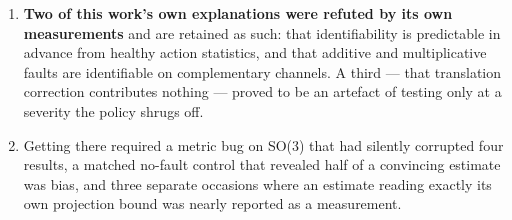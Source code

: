 \documentclass[11pt,a4paper]{article}
\begin{document}
\begin{enumerate}[leftmargin=1.6em,itemsep=3pt]
        transfer-cube to the healthy rate ($0/20 \to 5/20$) --- but only when the
        correction is held stationary after one sacrificial episode. A continuously
        updating correction of the same magnitude repairs nothing, because its 0.43\,cm
        of within-episode wander exceeds the task's 0.5\,cm margin. One measurable
        comparison --- task margin against correction wander --- predicts both robots'
        outcomes before any repair run (\S\ref{sec:aloha}).
  \item \textbf{Two of this work's own explanations were refuted by its own
        measurements} and are retained as such: that identifiability is
        predictable in advance from healthy action statistics, and that additive
        and multiplicative faults are identifiable on complementary channels.
        A third --- that translation correction contributes nothing --- proved to
        be an artefact of testing only at a severity the policy shrugs off.
  \item Getting there required a metric bug on SO(3) that had silently corrupted
        four results, a matched no-fault control that revealed half of a
        convincing estimate was bias, and three separate occasions where an
        estimate reading exactly its own projection bound was nearly reported as
        a measurement.
\end{enumerate}
\end{document}
